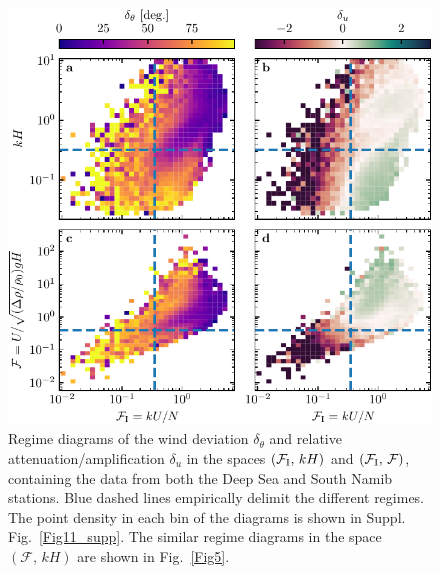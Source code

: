 \begin{figure}[p]
\centering
\includegraphics[scale=1]{Figures/Figure12_supp.pdf}
\caption{Regime diagrams of the wind deviation $\delta_{\theta}$ and relative attenuation/amplification $\delta_{u}$ in the spaces $(\mathcal{F}_{\textup{I}}, \, kH)$ and $(\mathcal{F}_{\textup{I}}, \, \mathcal{F})$, containing the data from both the Deep Sea and South Namib stations. Blue dashed lines empirically delimit the different regimes. The point density in each bin of the diagrams is shown in Suppl. Fig.~\ref{Fig11_supp}. The similar regime diagrams in the space $(\mathcal{F}, \, kH)$ are shown in Fig.~\ref{Fig5}.}
\label{Fig12_supp}
\end{figure}


